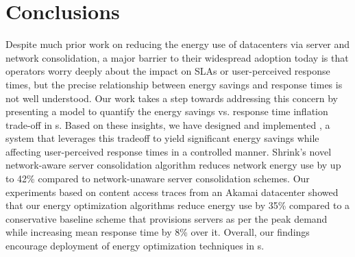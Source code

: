 \section{Conclusions}


Despite much prior work on reducing the energy use of datacenters via server and network consolidation, a major barrier to their widespread adoption today is that operators worry deeply about the impact on SLAs or user-perceived response times, but the precise relationship between energy savings and response times is not well understood. Our work takes a step towards addressing this concern by presenting a model to quantify the energy savings vs. response time inflation trade-off in \cdc s. Based on these insights, we have designed and implemented \shrink, a system that leverages this tradeoff to yield significant energy savings while affecting user-perceived response times in a controlled manner. Shrink's novel network-aware server consolidation algorithm reduces network energy use by up to 42\% compared to network-unaware server consolidation schemes. Our experiments based on content access traces from an Akamai datacenter showed that our energy optimization algorithms reduce energy use by 35\% compared to a conservative baseline scheme that provisions servers as per the peak demand while increasing mean response time by 8\% over it. Overall, our findings encourage deployment of energy optimization techniques  in \cdc s.



